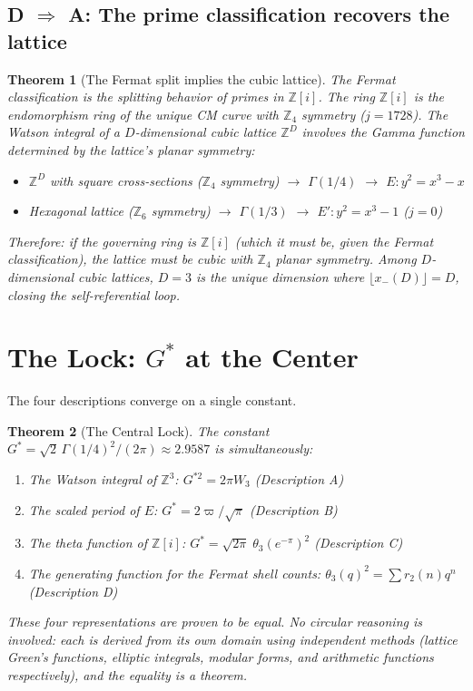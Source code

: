 \documentclass[12pt]{article}
\newtheorem{theorem}{Theorem}[section]
\theoremstyle{definition}
\theoremstyle{remark}
\begin{document}
\subsection{D $\Rightarrow$ A: The prime classification recovers the lattice}

\begin{theorem}[The Fermat split implies the cubic lattice]
\label{thm:DtoA}
The Fermat classification is the splitting behavior of primes in $\mathbb{Z}[i]$. The ring $\mathbb{Z}[i]$ is the endomorphism ring of the unique CM curve with $\mathbb{Z}_4$ symmetry ($j = 1728$). The Watson integral of a $D$-dimensional cubic lattice $\mathbb{Z}^D$ involves the Gamma function determined by the lattice's planar symmetry:
\begin{itemize}[nosep]
    \item $\mathbb{Z}^D$ with square cross-sections ($\mathbb{Z}_4$ symmetry) $\to$ $\Gamma(1/4)$ $\to$ $E\!: y^2 = x^3 - x$
    \item Hexagonal lattice ($\mathbb{Z}_6$ symmetry) $\to$ $\Gamma(1/3)$ $\to$ $E'\!: y^2 = x^3 - 1$ ($j = 0$)
\end{itemize}
Therefore: if the governing ring is $\mathbb{Z}[i]$ (which it must be, given the Fermat classification), the lattice must be cubic with $\mathbb{Z}_4$ planar symmetry. Among $D$-dimensional cubic lattices, $D = 3$ is the unique dimension where $\lfloor x_-(D) \rfloor = D$, closing the self-referential loop.
\end{theorem}

\section{The Lock: $G^*$ at the Center}
\label{sec:lock}

The four descriptions converge on a single constant.

\begin{theorem}[The Central Lock]
\label{thm:lock}
The constant $G^* = \sqrt{2}\,\Gamma(1/4)^2/(2\pi) \approx 2.9587$ is simultaneously:
\begin{enumerate}[nosep]
    \item The Watson integral of $\mathbb{Z}^3$: $G^{*2} = 2\pi W_3$ \quad (Description A)
    \item The scaled period of $E$: $G^* = 2\varpi/\sqrt{\pi}$ \quad (Description B)
    \item The theta function of $\mathbb{Z}[i]$: $G^* = \sqrt{2\pi}\;\theta_3(e^{-\pi})^2$ \quad (Description C)
    \item The generating function for the Fermat shell counts: $\theta_3(q)^2 = \sum r_2(n) q^n$ \quad (Description D)
\end{enumerate}
These four representations are proven to be equal. No circular reasoning is involved: each is derived from its own domain using independent methods (lattice Green's functions, elliptic integrals, modular forms, and arithmetic functions respectively), and the equality is a theorem.
\end{theorem}
\end{document}
